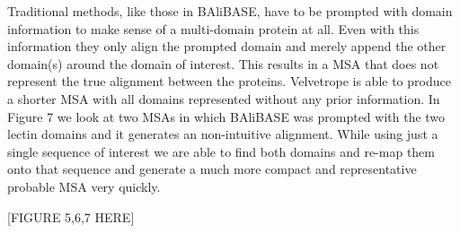 \documentclass[phd,tocprelim]{cornell}
\renewcommand{\caption}[1]{\singlespacing\hangcaption{#1}\normalspacing}
\begin{document}
Traditional methods, like those in BAliBASE, have to be prompted with domain information to make sense of a multi-domain protein at all. Even with this information they only align the prompted domain and merely append the other domain(s) around the domain of interest. This results in a MSA that does not represent the true alignment between the proteins. Velvetrope is able to produce a shorter MSA with all domains represented without any prior information. In Figure 7 we look at two MSAs in which BAliBASE was prompted with the two lectin domains and it generates an non-intuitive alignment. While using just a single sequence of interest we are able to find both domains and re-map them onto that sequence and generate a much more compact and representative probable MSA very quickly.

[FIGURE 5,6,7 HERE]

% 
% 
\end{document}
